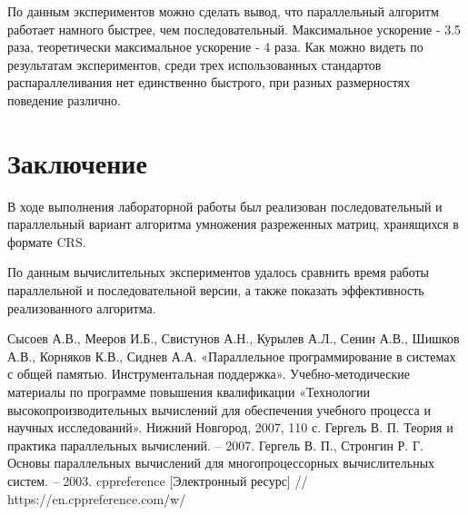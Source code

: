 \documentclass{report}
\begin{document}
\par По данным экспериментов можно сделать вывод, что параллельный алгоритм работает намного быстрее, чем последовательный. Максимальное ускорение - 3.5 раза, теоретически максимальное ускорение - 4 раза. Как можно видеть по результатам экспериментов, среди трех использованных стандартов распараллеливания нет единственно быстрого, при разных размерностях поведение различно.
\newpage

\section*{Заключение}
В ходе выполнения лабораторной работы был реализован последовательный и параллельный вариант алгоритма умножения разреженных матриц, хранящихся в формате CRS.
\par По данным вычислительных экспериментов удалось сравнить время работы параллельной и последовательной версии, а также показать эффективность реализованного алгоритма.

\newpage

\begin{thebibliography}{1}
 Сысоев А.В., Мееров И.Б., Свистунов А.Н., Курылев А.Л., Сенин А.В., Шишков А.В., Корняков К.В., Сиднев А.А. «Параллельное программирование в системах с общей памятью. Инструментальная поддержка». Учебно-методические материалы по программе повышения квалификации «Технологии высокопроизводительных вычислений для обеспечения учебного процесса и научных исследований». Нижний Новгород, 2007, 110 с. 
Гергель В. П. Теория и практика параллельных вычислений. – 2007. 
Гергель В. П., Стронгин Р. Г. Основы параллельных вычислений для многопроцессорных вычислительных систем. – 2003.
 cppreference [Электронный ресурс] // https://en.cppreference.com/w/
\end{thebibliography}
\end{document}
